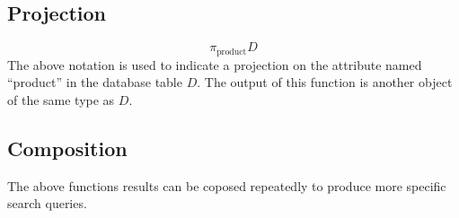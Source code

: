 \subsection{Projection}
\[\pi_{\text{product}}D\]
The above notation is used to indicate a projection on the attribute named ``product'' in the database table $D$.  The output of this function is another object of the same type as $D$.

\subsection{Composition}
The above functions results can be coposed repeatedly to produce more specific search queries.
